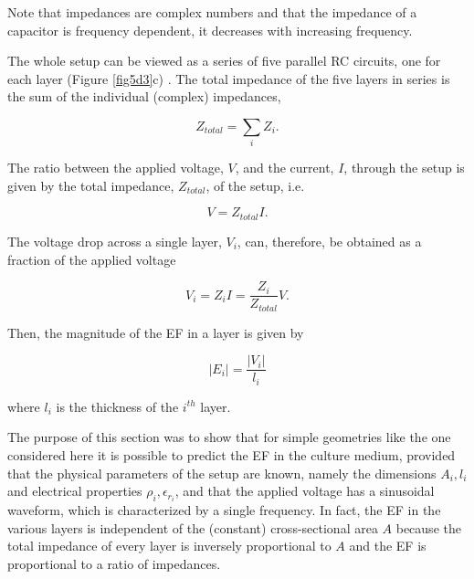 \noindent Note that impedances are complex numbers and that the impedance of a capacitor is frequency dependent, it decreases with increasing frequency. 

The whole setup can be viewed as a series of five parallel RC circuits, one for each layer (Figure \ref{fig5d3}c) \cite{Wiesmann2001-uh}. The total impedance of the five layers in series is the sum of the individual (complex) impedances,

\begin{equation}
\label{eqTotalimpedance}
Z_{total} = \sum_{i} Z_i.
\end{equation}

\noindent The ratio between the applied voltage, $V$, and the current, $I$, through the setup is given by the total impedance, $Z_{total}$, of the setup, i.e.

\begin{equation}
\label{eqOhms2}
V = Z_{total} I.
\end{equation}

The voltage drop across a single layer, $V_i$, can, therefore, be obtained as a fraction of the applied voltage

\begin{equation}
\label{eqOhms3}
V_i = Z_{i} I = \frac{Z_i}{Z_{total}} V.
\end{equation}

\noindent Then, the magnitude of the \acs{EF} in a layer is given by

\begin{equation}
\label{eqOhms4}
\lvert E_i \rvert = \frac{\lvert V_i \rvert}{l_i}
\end{equation}

\noindent where $l_i$ is the thickness of the $i^{th}$ layer.

The purpose of this section was to show that for simple geometries like the one considered here it is possible to predict the \acs{EF} in the culture medium, provided that the physical parameters of the setup are known, namely the dimensions $A_i, l_i$ and electrical properties $\rho_i, \epsilon_{r_i}$, and that the applied voltage has a sinusoidal waveform, which is characterized by a single frequency. In fact, the \acs{EF} in the various layers is independent of the (constant) cross-sectional area $A$ because the total impedance of every layer is inversely proportional to $A$ and the \acs{EF} is proportional to a ratio of impedances. 

